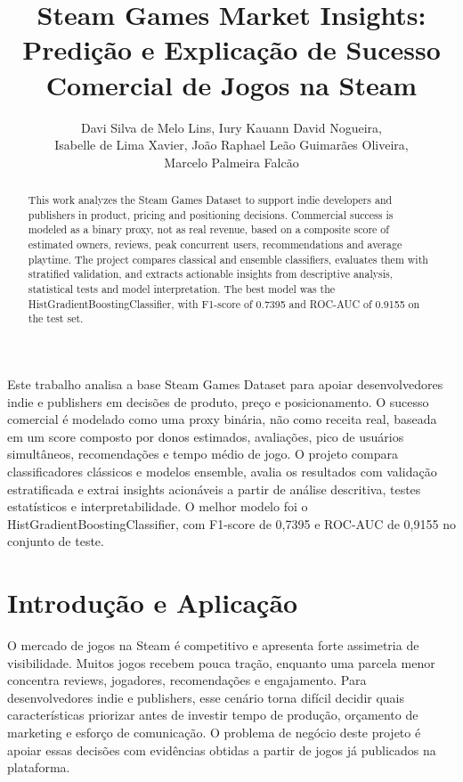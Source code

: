 \documentclass[12pt]{article}
\title{Steam Games Market Insights: Predição e Explicação de Sucesso Comercial de Jogos na Steam}
\author{Davi Silva de Melo Lins\inst{1}, Iury Kauann David Nogueira\inst{1},\\
Isabelle de Lima Xavier\inst{1}, João Raphael Leão Guimarães Oliveira\inst{1},\\
Marcelo Palmeira Falcão\inst{1}}
\begin{document}
\maketitle

\begin{abstract}
This work analyzes the Steam Games Dataset to support indie developers and publishers in product, pricing and positioning decisions. Commercial success is modeled as a binary proxy, not as real revenue, based on a composite score of estimated owners, reviews, peak concurrent users, recommendations and average playtime. The project compares classical and ensemble classifiers, evaluates them with stratified validation, and extracts actionable insights from descriptive analysis, statistical tests and model interpretation. The best model was the HistGradientBoostingClassifier, with F1-score of 0.7395 and ROC-AUC of 0.9155 on the test set.
\end{abstract}

\begin{resumo}
Este trabalho analisa a base Steam Games Dataset para apoiar desenvolvedores indie e publishers em decisões de produto, preço e posicionamento. O sucesso comercial é modelado como uma proxy binária, não como receita real, baseada em um score composto por donos estimados, avaliações, pico de usuários simultâneos, recomendações e tempo médio de jogo. O projeto compara classificadores clássicos e modelos ensemble, avalia os resultados com validação estratificada e extrai insights acionáveis a partir de análise descritiva, testes estatísticos e interpretabilidade. O melhor modelo foi o HistGradientBoostingClassifier, com F1-score de 0,7395 e ROC-AUC de 0,9155 no conjunto de teste.
\end{resumo}

\section{Introdução e Aplicação}

O mercado de jogos na Steam é competitivo e apresenta forte assimetria de visibilidade. Muitos jogos recebem pouca tração, enquanto uma parcela menor concentra reviews, jogadores, recomendações e engajamento. Para desenvolvedores indie e publishers, esse cenário torna difícil decidir quais características priorizar antes de investir tempo de produção, orçamento de marketing e esforço de comunicação. O problema de negócio deste projeto é apoiar essas decisões com evidências obtidas a partir de jogos já publicados na plataforma.
\end{document}
